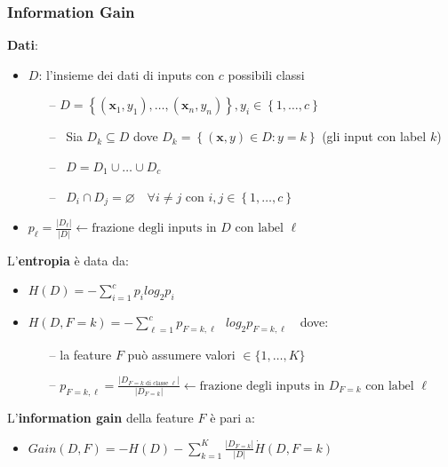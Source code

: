 \begin{frame}
	
	\frametitle{Information Gain}
	
	
	\textbf{Dati}:
	\begin{itemize}
		\item $D$: l'insieme dei dati di inputs con $c$ possibili classi
		
		\begin{itemize}
			\item[--] $D=\left \{ \left ( \mathbf{x}_1,y_1 \right ),\dots,\left ( \mathbf{x}_n,y_n \right ) \right \}, y_i\in\left \{ 1,\dots,c \right \}$
			\item[--] Sia $D_k\subseteq D$ dove $D_k=\left \{ \left ( \mathbf{x},y \right )\in D:y=k \right \}$ (gli input con label $k$)
			\item[--] $D=D_1\cup \dots \cup D_c$
			\item[--] $D_i\cap D_j=\varnothing \quad \forall i \neq j \text{ con }i, j \in\left \{ 1,\dots,c \right \}$
		\end{itemize}
		\item $p_\ell=\frac{\left | D_\ell \right |}{\left | D \right |}\leftarrow \textrm{frazione degli inputs in } D \textrm{ con label } \ell$
	\end{itemize}
	
	L'\textbf{entropia} è data da:
	
	\begin{itemize}
		\item $H(D)=-\sum_{i=1}^c p_i log_2 p_i$
		\item $H(D, F = k)= -\sum_{\ell=1}^c p_{F=k, \ell} \text{ } log_2 p_{F=k, \ell} \text{ }$ dove:
		\begin{itemize}
			\item[--] la feature $F$ può assumere valori $\in \{ 1,\dots,K \}$
			\item[--] $p_{F=k, \ell}=\frac{\left | D_{F = k \text{ di classe } \ell} \right |}{\left | D_{F = k} \right |}\leftarrow \textrm{frazione degli inputs in } D_{F = k} \textrm{ con label } \ell$
		\end{itemize}
	\end{itemize}
	
	L'\textbf{information gain} della feature $F$ è pari a:
	\begin{itemize}
		\item $Gain(D, F)= -H(D) -\sum_{k=1}^K \frac{|D_{F=k}|}{|D|} \dot H(D, F = k)$
	\end{itemize}	
	
\end{frame}


